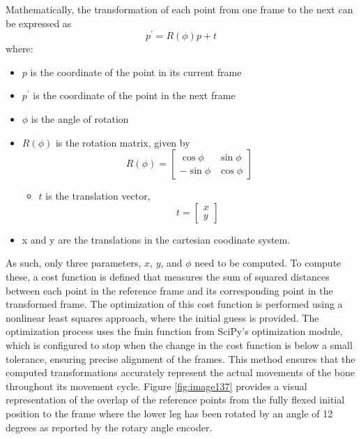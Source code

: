 \documentclass{micro-econ-thesis}
\begin{document}
Mathematically, the transformation of each point from one frame to the next can be expressed as 
\begin{equation}
	p^{'} = R(\phi)p + t 
\end{equation}
where: 
\begin{itemize}
	\item \textbf{$p$} is the coordinate of the point in its current frame
	\item \textbf{$p^{'}$} is the coordinate of the point in the next frame
	\item $\phi$ is the angle of rotation
	\item \textbf{$R(\phi)$}  is the rotation matrix, given by 
	 \[
	 R(\phi) = 
	 \begin{bmatrix}
	 	\cos \phi & \sin \phi \\
	 	-\sin \phi & \cos \phi
	 \end{bmatrix}
	 \]
	 \begin{itemize}
	 	\item $t$ is the translation vector,
	 	\[
	 	t = \begin{bmatrix}
	 		x \\
	 		y
	 	\end{bmatrix}
	 	\]
	 \end{itemize}
 	\item x and y are the translations in the cartesian coodinate system. 
\end{itemize}   
As such, only three parameters, $x$, $y$, and $\phi$ need to be computed. To compute these, a cost function is defined that measures the sum of squared distances between each point in the reference frame and its corresponding point in the transformed frame. The optimization of this cost function is performed using a nonlinear least squares approach, where the initial guess is provided. The optimization process uses the fmin function from SciPy’s optimization module, which is configured to stop when the change in the cost function is below a small tolerance, ensuring precise alignment of the frames. This method ensures that the computed transformations accurately represent the actual movements of the bone throughout its movement cycle. Figure \ref{fig:image137} provides a visual representation of the overlap of the reference points from the fully flexed initial position to the frame where the lower leg has been rotated by an angle of 12 degrees as reported by the rotary angle encoder. 
\end{document}
